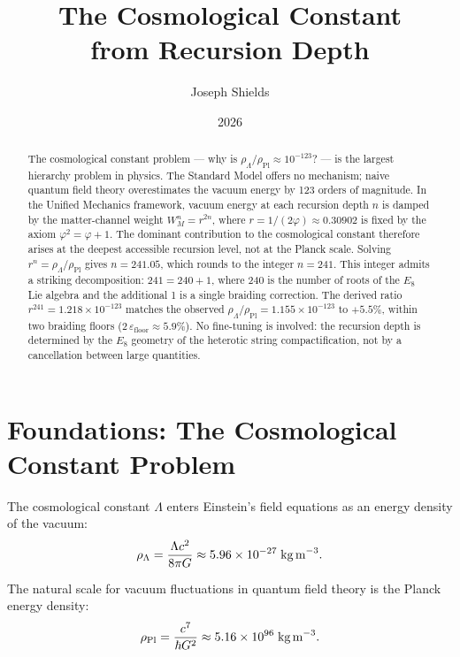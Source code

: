 \documentclass[12pt]{article}
\title{\textbf{The Cosmological Constant\\
from Recursion Depth}}
\author{Joseph Shields}
\date{2026}
\begin{document}
\maketitle

\begin{abstract}
The cosmological constant problem --- why is
$\rho_\Lambda/\rho_{\text{Pl}} \approx 10^{-123}$? --- is the
largest hierarchy problem in physics.  The Standard Model offers
no mechanism; naive quantum field theory overestimates the vacuum
energy by 123 orders of magnitude.  In the Unified Mechanics
framework, vacuum energy at each recursion depth $n$ is damped by
the matter-channel weight $W_M^n = r^{2n}$, where
$r = 1/(2\varphi) \approx 0.30902$ is fixed by the axiom
$\varphi^2 = \varphi + 1$.  The dominant contribution to the cosmological
constant therefore arises at the deepest accessible recursion
level, not at the Planck scale.  Solving $r^n = \rho_\Lambda/\rho_{\text{Pl}}$
gives $n = 241.05$, which rounds to the integer $n = 241$.
This integer admits a striking decomposition: $241 = 240 + 1$,
where 240 is the number of roots of the $E_8$ Lie algebra and
the additional 1 is a single braiding correction.  The derived
ratio $r^{241} = 1.218 \times 10^{-123}$ matches the observed
$\rho_\Lambda/\rho_{\text{Pl}} = 1.155 \times 10^{-123}$ to
$+5.5\%$, within two braiding floors
($2\,\varepsilon_{\text{floor}} \approx 5.9\%$).  No fine-tuning
is involved: the recursion depth is determined by the $E_8$
geometry of the heterotic string compactification, not by
a cancellation between large quantities.
\end{abstract}

\section{Foundations: The Cosmological Constant Problem}

The cosmological constant $\Lambda$ enters Einstein's field equations
as an energy density of the vacuum:
\begin{equation}
  \rho_\Lambda
    = \frac{\Lambda c^2}{8\pi G}
    \approx 5.96 \times 10^{-27}\;\text{kg\,m}^{-3}.
\end{equation}

The natural scale for vacuum fluctuations in quantum field theory
is the Planck energy density:
\begin{equation}
  \rho_{\text{Pl}}
    = \frac{c^7}{\hbar G^2}
    \approx 5.16 \times 10^{96}\;\text{kg\,m}^{-3}.
\end{equation}
\end{document}
